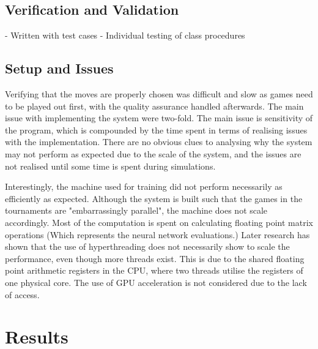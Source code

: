 \documentclass[12pt,a4paper]{article}
\begin{document}
    \subsection{Verification and Validation}
        - Written with test cases
        - Individual testing of class procedures

    \subsection{Setup and Issues}
       
        Verifying that the moves are properly chosen was difficult and slow as games need to be played out first, with the quality assurance handled afterwards. The main issue with implementing the system were two-fold. The main issue is sensitivity of the program, which is compounded by the time spent in terms of realising issues with the implementation. There are no obvious clues to analysing why the system may not perform as expected due to the scale of the system, and the issues are not realised until some time is spent during simulations.

        Interestingly, the machine used for training did not perform necessarily as efficiently as expected. Although the system is built such that the games in the tournaments are "embarrassingly parallel", the machine does not scale accordingly. Most of the computation is spent on calculating floating point matrix operations (Which represents the neural network evaluations.) Later research has shown that the use of hyperthreading does not necessarily show to scale the performance, even though more threads exist. \cite{leng_empirical_2002} This is due to the shared floating point arithmetic registers in the CPU, where two threads utilise the registers of one physical core. The use of GPU acceleration is not considered due to the lack of access. 
    
\section{Results}
    

\end{document}
